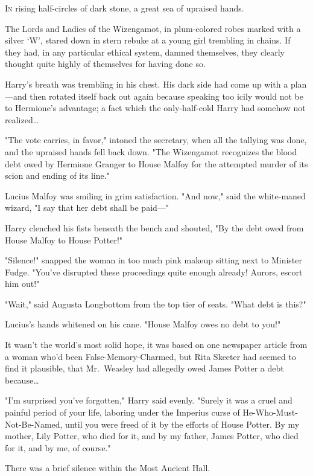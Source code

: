 
\lettrine{I}{n} rising 
half-circles of dark stone, a great sea of upraised hands.

The Lords and Ladies of the Wizengamot, in plum-colored robes marked with a 
silver `W', stared down in stern rebuke at a young girl trembling in chains. If 
they had, in any particular ethical system, damned themselves, they clearly 
thought quite highly of themselves for having done so.

Harry's breath was trembling in his chest. His dark side had come up with a 
plan---and then rotated itself back out again because speaking too icily would 
not be to Hermione's advantage; a fact which the only-half-cold Harry had 
somehow not realized{\ldots}

"The vote carries, in favor," intoned the secretary, when all the tallying was 
done, and the upraised hands fell back down. "The Wizengamot recognizes the 
blood debt owed by Hermione Granger to House Malfoy for the attempted murder of 
its scion and ending of its line."

Lucius Malfoy was smiling in grim satisfaction. "And now," said the white-maned 
wizard, "I say that her debt shall be paid---"

Harry clenched his fists beneath the bench and shouted, "By the debt owed from 
House Malfoy to House Potter!"

"Silence!" snapped the woman in too much pink makeup sitting next to Minister 
Fudge. "You've disrupted these proceedings quite enough already! Aurors, escort 
him out!"

"Wait," said Augusta Longbottom from the top tier of seats. "What debt is this?"

Lucius's hands whitened on his cane. "House Malfoy owes no debt to you!"

It wasn't the world's most solid hope, it was based on one newspaper article 
from a woman who'd been False-Memory-Charmed, but Rita Skeeter had seemed to 
find it plausible, that Mr.~Weasley had allegedly owed James Potter a debt 
because{\ldots}

"I'm surprised you've forgotten," Harry said evenly. "Surely it was a cruel and 
painful period of your life, laboring under the Imperius curse of 
He-Who-Must-Not-Be-Named, until you were freed of it by the efforts of House 
Potter. By my mother, Lily Potter, who died for it, and by my father, James 
Potter, who died for it, and by me, of course."

There was a brief silence within the Most Ancient Hall.

